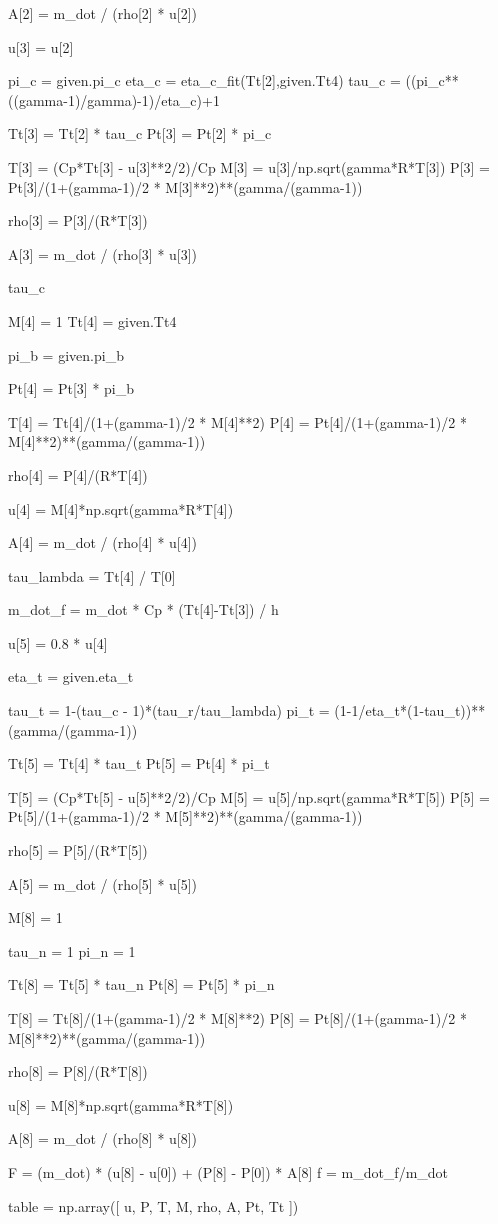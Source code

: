 \documentclass[journal ]{new-aiaa}
\begin{document}
\begin{python}
A[2] = m_dot / (rho[2] * u[2])

u[3] = u[2]

pi_c = given.pi_c
eta_c = eta_c_fit(Tt[2],given.Tt4)
tau_c =  ((pi_c**((gamma-1)/gamma)-1)/eta_c)+1

Tt[3] = Tt[2] * tau_c
Pt[3] = Pt[2] * pi_c

T[3] = (Cp*Tt[3] - u[3]**2/2)/Cp
M[3] = u[3]/np.sqrt(gamma*R*T[3])
P[3] = Pt[3]/(1+(gamma-1)/2 * M[3]**2)**(gamma/(gamma-1))

rho[3] = P[3]/(R*T[3])

A[3] = m_dot / (rho[3] * u[3])

tau_c

M[4] = 1
Tt[4] = given.Tt4

pi_b = given.pi_b

Pt[4] = Pt[3] * pi_b

T[4] = Tt[4]/(1+(gamma-1)/2 * M[4]**2)
P[4] = Pt[4]/(1+(gamma-1)/2 * M[4]**2)**(gamma/(gamma-1))

rho[4] = P[4]/(R*T[4])

u[4] = M[4]*np.sqrt(gamma*R*T[4])

A[4] = m_dot / (rho[4] * u[4])

tau_lambda = Tt[4] / T[0]

m_dot_f = m_dot * Cp * (Tt[4]-Tt[3]) / h

u[5] = 0.8 * u[4]

eta_t = given.eta_t

tau_t = 1-(tau_c - 1)*(tau_r/tau_lambda)
pi_t = (1-1/eta_t*(1-tau_t))**(gamma/(gamma-1))

Tt[5] = Tt[4] * tau_t
Pt[5] = Pt[4] * pi_t

T[5] = (Cp*Tt[5] - u[5]**2/2)/Cp
M[5] = u[5]/np.sqrt(gamma*R*T[5])
P[5] = Pt[5]/(1+(gamma-1)/2 * M[5]**2)**(gamma/(gamma-1))

rho[5] = P[5]/(R*T[5])

A[5] = m_dot / (rho[5] * u[5])

M[8] = 1

tau_n = 1
pi_n = 1

Tt[8] = Tt[5] * tau_n
Pt[8] = Pt[5] * pi_n

T[8] = Tt[8]/(1+(gamma-1)/2 * M[8]**2)
P[8] = Pt[8]/(1+(gamma-1)/2 * M[8]**2)**(gamma/(gamma-1))

rho[8] = P[8]/(R*T[8])

u[8] = M[8]*np.sqrt(gamma*R*T[8])

A[8] = m_dot / (rho[8] * u[8])

F = (m_dot) * (u[8] - u[0]) + (P[8] - P[0]) * A[8]
f = m_dot_f/m_dot

table = np.array([
    u,
    P,
    T,
    M,
    rho,
    A,
    Pt,
    Tt 
])
    \end{python}
\end{document}

